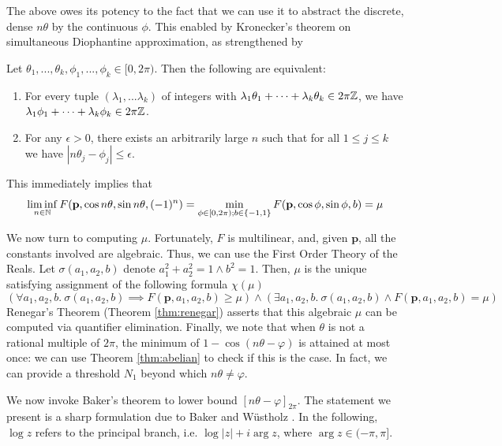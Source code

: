  The above owes its potency to the fact that we can use it to abstract the discrete, dense $n\theta$ by the continuous $\phi$. This enabled by Kronecker's theorem on simultaneous Diophantine approximation, as strengthened by \cite{joeljames3, ouaknine2014positivity}
 
 \begin{theorem}
  \label{thm:kronecker}
  Let $\theta_1, ... , \theta_k, \phi_1, ... , \phi_k \in [0, 2\pi)$. Then the following are equivalent:
  \begin{enumerate}
\item For every tuple $(\lambda_1,...\lambda_k)$ of integers with 
    $\lambda_1 \theta_1 + \cdots +  \lambda_k \theta_k \in 2\pi\mathbb{Z}$, 
  we have \\$\lambda_1 \phi_1 + \cdots + \lambda_k \phi_k \in 2\pi\mathbb{Z}$.
  \item For any $\epsilon > 0$, there exists an arbitrarily large $n$ such that for all 
    $1 \le j \le k$ we have $| n \theta_j - \phi_j| \le \epsilon$.
    \end{enumerate}
  \end{theorem}
  
This immediately implies that
\begin{equation}
\liminf_{n \in \mathbb{N}} F(\mathbf{p}, \cos n\theta, \sin n\theta, (-1)^n) = \min_{\phi \in [0, 2\pi); b\in\{-1, 1\}} F(\mathbf{p}, \cos \phi, \sin \phi, b) = \mu
\end{equation}

We now turn to computing $\mu$. Fortunately, $F$ is multilinear, and, given $\mathbf{p}$, all the constants involved are algebraic. Thus, we can use the First Order Theory of the Reals. Let $\sigma(a_1, a_2, b)$ denote $a_1^2 + a_2^2 = 1 \land b^2 =1$. Then, $\mu$ is the unique satisfying assignment of the following formula $\chi(\mu)$
$$
(\forall a_1, a_2, b.~ \sigma(a_1, a_2, b) \implies F(\mathbf{p}, a_1, a_2, b) \ge \mu) \land (\exists a_1, a_2, b.~ \sigma(a_1, a_2, b) \land F(\mathbf{p}, a_1, a_2, b) = \mu)
$$
Renegar's Theorem (Theorem \ref{thm:renegar}) asserts that this algebraic $\mu$ can be computed via quantifier elimination. Finally, we note that when $\theta$ is not a rational multiple of $2\pi$, the minimum of $1 - \cos(n\theta - \varphi)$ is attained at most once: we can use Theorem \ref{thm:abelian} to check if this is the case. In fact, we can provide a threshold $N_1$ beyond which $n\theta \ne \varphi$. 

We now invoke Baker's theorem to lower bound $[n\theta - \varphi]_{2\pi}$. The statement we present is a sharp formulation due to Baker and W{\"u}stholz \cite{baker}. In the following, $\log z$ refers to the principal branch, i.e. $\log |z| + i \arg z$, where $\arg z \in (-\pi, \pi]$.

